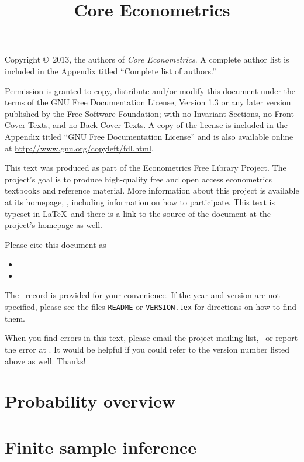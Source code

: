 \documentclass[oneside,openany,notitlepage]{tufte-book}
\title{Core Econometrics}
\begin{document}
\maketitle

\bigskip\noindent%
Copyright \copyright\ 2013, the authors of \textit{Core Econometrics}.
A complete author list is included in the Appendix titled ``Complete
list of authors.''

Permission is granted to copy, distribute and/or modify this document
under the terms of the GNU Free Documentation License, Version 1.3 or
any later version published by the Free Software Foundation; with no
Invariant Sections, no Front-Cover Texts, and no Back-Cover Texts.  A
copy of the license is included in the Appendix titled ``GNU Free
Documentation License'' and is also available online at
\url{http://www.gnu.org/copyleft/fdl.html}.

This text was produced as part of the Econometrics Free Library
Project.  The project's goal is to produce high-quality free and
open access econometrics textbooks and reference material.  More
information about this project is available at its homepage,
\homepage, including information on how
to participate.  This text is typeset in \LaTeX\ and there is a link
to the source of the document at the project's homepage as well.

Please cite this document as
\begin{itemize}
\item[] 
\item[] 
\end{itemize}
The \BibTeX\ record is provided for your convenience.
If the year and version are not specified, please see the files
\texttt{README} or \texttt{VERSION.tex} for directions on how to
find them.

When you find errors in this text, please email the project mailing
list, \maillist\ or report the error at \bugtrack.  It would be
helpful if you could refer to the version number listed above as well.
Thanks!

\tableofcontents
\listoftables
\listoffigures

\part{Probability overview}




\part{Finite sample inference}










\end{document}
